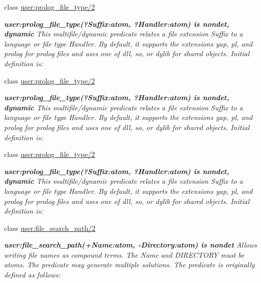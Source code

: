 \begin{DoxyCompactItemize}
class \hyperlink{classuser_1_1prolog__file__type_22}{user\+:prolog\+\_\+file\+\_\+type/2}
\begin{DoxyCompactList}\small\item\em {\bfseries  user\+:prolog\+\_\+file\+\_\+type(?Suffix\+:atom, ?Handler\+:atom) is nondet, dynamic } This multifile/dynamic predicate relates a file extension {\itshape Suffix} to a language or file type {\itshape Handler}. By default, it supports the extensions yap, pl, and prolog for prolog files and uses one of dll, so, or dylib for shared objects. Initial definition is\+: \end{DoxyCompactList}\item 
class \hyperlink{classuser_1_1prolog__file__type_22}{user\+:prolog\+\_\+file\+\_\+type/2}
\begin{DoxyCompactList}\small\item\em {\bfseries  user\+:prolog\+\_\+file\+\_\+type(?Suffix\+:atom, ?Handler\+:atom) is nondet, dynamic } This multifile/dynamic predicate relates a file extension {\itshape Suffix} to a language or file type {\itshape Handler}. By default, it supports the extensions yap, pl, and prolog for prolog files and uses one of dll, so, or dylib for shared objects. Initial definition is\+: \end{DoxyCompactList}\item 
class \hyperlink{classuser_1_1prolog__file__type_22}{user\+:prolog\+\_\+file\+\_\+type/2}
\begin{DoxyCompactList}\small\item\em {\bfseries  user\+:prolog\+\_\+file\+\_\+type(?Suffix\+:atom, ?Handler\+:atom) is nondet, dynamic } This multifile/dynamic predicate relates a file extension {\itshape Suffix} to a language or file type {\itshape Handler}. By default, it supports the extensions yap, pl, and prolog for prolog files and uses one of dll, so, or dylib for shared objects. Initial definition is\+: \end{DoxyCompactList}\item 
class \hyperlink{classuser_1_1file__search__path_22}{user\+:file\+\_\+search\+\_\+path/2}
\begin{DoxyCompactList}\small\item\em {\bfseries  user\+:file\+\_\+search\+\_\+path(+\+Name\+:atom, -\/\+Directory\+:atom) is nondet } Allows writing file names as compound terms. The {\itshape Name} and {\itshape D\+I\+R\+E\+C\+T\+O\+RY} must be atoms. The predicate may generate multiple solutions. The predicate is originally defined as follows\+: \end{DoxyCompactList}\item 

\end{DoxyCompactItemize}
